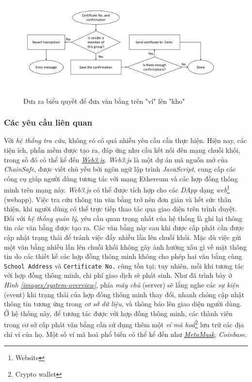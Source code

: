\begin{figure}[!ht]
    \centering
    \includegraphics[width=400px]{images/multisig-confirm-cert.png}
    \caption{Đưa ra biểu quyết để đưa văn bằng trên "ví" lên "kho"}
\end{figure}


\subsubsection{Các yêu cầu liên quan}
Với \textit{hệ thống tra cứu}, không có có quá nhiều yêu cầu cần thực hiện. Hiện nay, các tiện ích, phần mềm được tạo ra, đáp ứng nhu cầu kết nối đến mạng chuỗi khối, trong số đó có thể kể đến \href{https://github.com/ChainSafe/web3.js}{\textit{Web3.js}}. \textit{Web3.js} là một dự án mã nguồn mở của \textit{ChainSafe}, được viết chủ yếu bởi ngôn ngữ lập trình \textit{JavaScript}, cung cấp các công cụ giúp người dùng tương tác với mạng Ethereum và các hợp đồng thông minh trên mạng này. \textit{Web3.js} có thể được tích hợp cho các \textit{DApp} dạng \textit{web}\footnote{Website} (webapp). Việc tra cứu thông tin văn bằng trở nên đơn giản và hết sức thân thiện, khi người dùng có thể trực tiếp thao tác qua giao diện trên trình duyệt.\\

Đối với \textit{hệ thống quản lý}, yêu cầu quan trọng nhất của hệ thống là ghi lại thông tin các văn bằng được tạo ra. Các văn bằng này sau khi được cấp phát cần được cập nhật trạng thái để tránh việc đẩy nhiều lần lên chuỗi khối. Mặc dù việc gửi một văn bằng nhiều lần lên chuỗi khối không gây ảnh hưởng xấu gì về mặt thông tin do các thiết kế các hợp đồng thông minh không cho phép hai văn bằng cùng \texttt{School Address} và \texttt{Certificate No.} cùng tồn tại; tuy nhiên, mỗi khi tương tác với hợp đồng thông minh, chi phí giao dịch sẽ phát sinh. Như đã trình bày ở \textit{Hình \ref{images/system-overview}}, phía \textit{máy chủ} (server) sẽ lắng nghe các \textit{sự kiện} (event) khi trạng thái của hợp đồng thông minh thay đổi, nhanh chóng cập nhật thông tin tương ứng trong \textit{cơ sở dữ liệu}, và thông báo lên giao diện người dùng. Ở hệ thống này, để tương tác được với hợp đồng thông minh, các thành viên trong cơ sở cấp phát văn bằng cần sử dụng thêm một \textit{ví mã hoá}\footnote{Crypto wallet} lưu trữ các địa chỉ ví của họ. Một số ví mã hoá phổ biến có thể kể đến như \href{https://metamask.io/}{\textit{MetaMask}}, \textit{Coinbase}.\\

